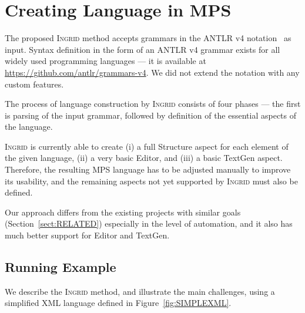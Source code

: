 \section{Creating Language in MPS}
\label{sect:LANGDEF}

The proposed \textsc{Ingrid} method accepts grammars in the ANTLR v4 notation~\cite{ref:ANTLRBOOK} as input.
Syntax definition in the form of an ANTLR v4 grammar exists for all widely used programming languages --- it is available at \url{https://github.com/antlr/grammars-v4}.
We did not extend the notation with any custom features.

The process of language construction by \textsc{Ingrid} consists of four phases --- the first is parsing of the input grammar, followed by definition of the essential aspects of the language.

\textsc{Ingrid} is currently able to create (i) a full Structure aspect for each element of the given language, (ii) a very basic Editor, and (iii) a basic TextGen aspect.
Therefore, the resulting MPS language has to be adjusted manually to improve its usability, and the remaining aspects not yet supported by \textsc{Ingrid} must also be defined.

Our approach differs from the existing projects with similar goals (Section~\ref{sect:RELATED}) especially in the level of automation, and it also has much better support for Editor and TextGen.

\subsection{Running Example}

We describe the \textsc{Ingrid} method, and illustrate the main challenges, using a simplified XML language defined in Figure~\ref{fig:SIMPLEXML}.

